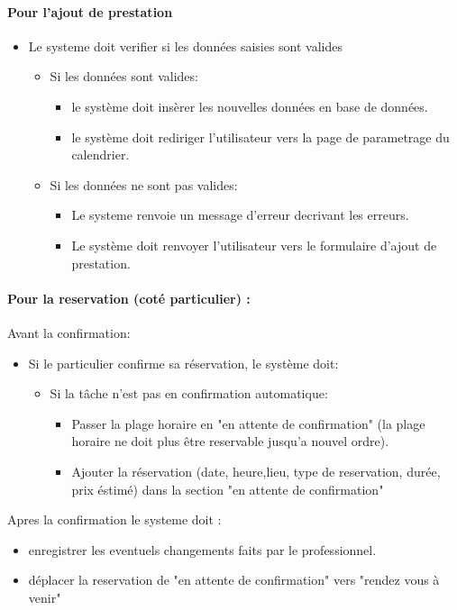 \documentclass{article}
\begin{document}
\paragraph{Pour l'ajout de prestation}
\begin{itemize}
\item Le systeme doit verifier si les données saisies sont valides
	\begin{itemize}
	\item Si les données sont valides:
		\begin{itemize}
		\item le système doit insèrer les nouvelles données en base
                  de données.
                  \item le système doit rediriger l'utilisateur vers
                    la page de parametrage du calendrier.
		\end{itemize}
		\item Si les données ne sont pas valides:
		\begin{itemize}
		\item Le systeme renvoie un message d'erreur decrivant
                  les erreurs.
                \item Le système doit renvoyer l'utilisateur vers le
                  formulaire d'ajout de prestation.
		\end{itemize}
	\end{itemize}
\end{itemize}


\paragraph{Pour la reservation (coté particulier) :}
Avant la confirmation:
	\begin{itemize}
	\item Si le particulier confirme sa réservation, le système doit:
	\begin{itemize}
	\item Si la tâche n'est pas en confirmation automatique:
		\begin{itemize}
		\item Passer la plage horaire en "en attente de confirmation"
			(la plage horaire ne doit plus être reservable jusqu'a nouvel ordre).
		\item Ajouter la réservation (date, heure,lieu, type de reservation, durée, prix éstimé) dans la section "en attente de confirmation"
		\end{itemize}
		\end{itemize}
	\end{itemize}
Apres la confirmation le systeme doit :
		\begin{itemize}
		\item enregistrer les eventuels changements faits par le professionnel.
		\item déplacer la reservation de "en attente de confirmation" vers "rendez vous à venir"
		\end{itemize}
\end{document}
